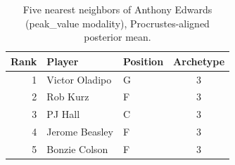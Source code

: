 \begin{table}[htbp]
  \centering\small
  \begin{tabular}{rllc}
    \toprule
    Rank & Player & Position & Archetype \\
    \midrule
    1 & Victor Oladipo & G & 3 \\
    2 & Rob Kurz & F & 3 \\
    3 & PJ Hall & C & 3 \\
    4 & Jerome Beasley & F & 3 \\
    5 & Bonzie Colson & F & 3 \\
    \bottomrule
  \end{tabular}
  \caption{Five nearest neighbors of Anthony Edwards (peak_value modality), Procrustes-aligned posterior mean.}
  \label{tab:Anthony_Edwards_neighbors_peak_value}
\end{table}

